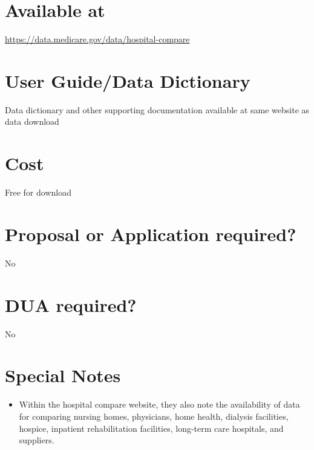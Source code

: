 \documentclass[
]{book}
\providecommand{\tightlist}{%
  \setlength{\itemsep}{0pt}\setlength{\parskip}{0pt}}
\begin{document}
\hypertarget{available-at-32}{%
\section{Available at}\label{available-at-32}}

\url{https://data.medicare.gov/data/hospital-compare}

\hypertarget{user-guidedata-dictionary-32}{%
\section{User Guide/Data Dictionary}\label{user-guidedata-dictionary-32}}

Data dictionary and other supporting documentation available at same website as data download

\hypertarget{cost-32}{%
\section{Cost}\label{cost-32}}

Free for download

\hypertarget{proposal-or-application-required-32}{%
\section{Proposal or Application required?}\label{proposal-or-application-required-32}}

No

\hypertarget{dua-required-32}{%
\section{DUA required?}\label{dua-required-32}}

No

\hypertarget{special-notes-32}{%
\section{Special Notes}\label{special-notes-32}}

\begin{itemize}
\tightlist
\item
  Within the hospital compare website, they also note the availability of data for comparing nursing homes, physicians, home health, dialysis facilities, hospice, inpatient rehabilitation facilities, long-term care hospitals, and suppliers.
\end{itemize}

\mainmatter
\end{document}
